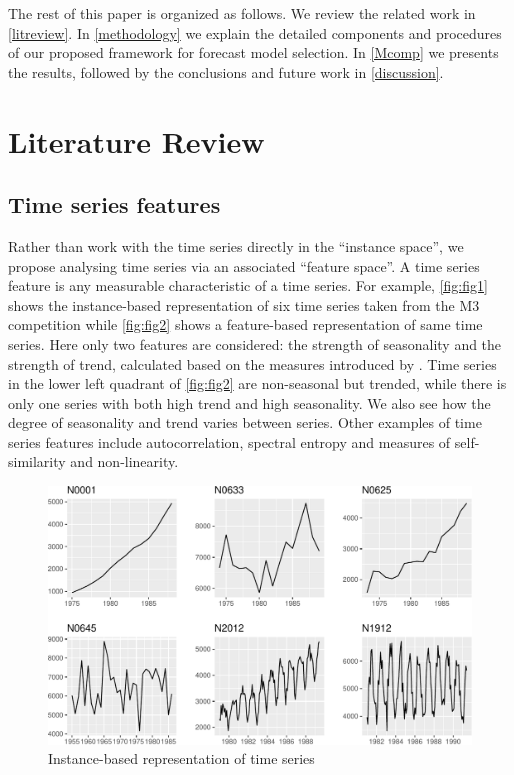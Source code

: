 \documentclass[11pt,a4paper,]{article}
\theoremstyle{definition}
\theoremstyle{definition}
\theoremstyle{definition}
\theoremstyle{remark}
\begin{document}
The rest of this paper is organized as follows. We review the related
work in \autoref{litreview}. In \autoref{methodology} we explain the
detailed components and procedures of our proposed framework for
forecast model selection. In \autoref{Mcomp} we presents the results,
followed by the conclusions and future work in \autoref{discussion}.

\section{Literature Review}\label{litreview}

\subsection{Time series features}\label{time-series-features}

Rather than work with the time series directly in the ``instance
space'', we propose analysing time series via an associated ``feature
space''. A time series feature is any measurable characteristic of a
time series. For example, \autoref{fig:fig1} shows the instance-based
representation of six time series taken from the M3 competition
\autocite{makridakis2000m3} while \autoref{fig:fig2} shows a
feature-based representation of same time series. Here only two features
are considered: the strength of seasonality and the strength of trend,
calculated based on the measures introduced by \textcite{wang2009rule}.
Time series in the lower left quadrant of \autoref{fig:fig2} are
non-seasonal but trended, while there is only one series with both high
trend and high seasonality. We also see how the degree of seasonality
and trend varies between series. Other examples of time series features
include autocorrelation, spectral entropy and measures of
self-similarity and non-linearity.

\begin{figure}

{\centering \includegraphics[width=\textwidth]{figure/fig1-1} 

}

\caption{Instance-based representation of time series}\label{fig:fig1}
\end{figure}
\end{document}
